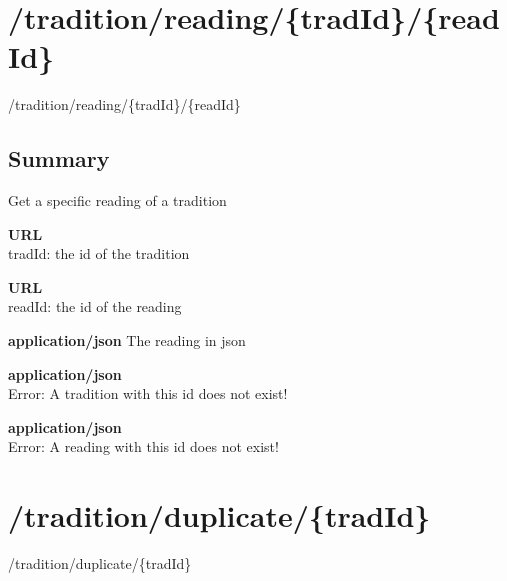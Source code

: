 \documentclass[11pt,fleqn,openany]{book} %
\begin{document}
\section{/tradition/reading/\{tradId\}/\{readId\}}
\begin{get}
/tradition/reading/\{tradId\}/\{readId\}
\end{get}

\subsection*{Summary}
Get a specific reading of a tradition
\begin{parameter}\textbf{URL}\\
tradId: the id of the tradition \\
\end{parameter}
\begin{parameter}\textbf{URL}\\
readId: the id of the reading \\
\end{parameter}
\begin{return}[OK]
\textbf{application/json} The reading in json\\
\end{return}
\begin{return}
\textbf{application/json}\\
Error: A tradition with this id does not exist!
\end{return}
\begin{return}
\textbf{application/json}\\
Error: A reading with this id does not exist!
\end{return}

\section{/tradition/duplicate/\{tradId\}}
\begin{post}
/tradition/duplicate/\{tradId\}
\end{post}
\end{document}
